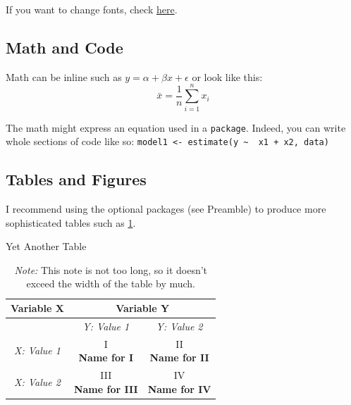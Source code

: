 \documentclass{iheid}
\begin{document}
If you want to change fonts, check \href{https://www.tug.org/pracjourn/2006-1/schmidt/schmidt.pdf}{here}.

\subsection{Math and Code}
Math can be inline such as $ y = \alpha + \beta x + \epsilon $ or look like this: 
$$ \bar{x} = \frac{1}{n} \sum_{i=1}^{n}x_i $$

The math might express an equation used in a \texttt{package}. 
Indeed, you can write whole sections of code like so:
\texttt{model1 <- estimate(y \textasciitilde~ x1 + x2, data)}

\subsection{Tables and Figures}

I recommend using the optional packages (see Preamble) to produce more sophisticated tables such as \cref{tab:alternative}.

\begin{table}[H]
\centering
\caption{Yet Another Table}
\label{tab:alternative}
    \begin{tabular}{c c c}
    	\toprule
    	\textbf{Variable X} & \multicolumn{2}{c}{\textbf{Variable Y}} \\
    	\midrule
        & \textit{Y: Value 1} & \textit{Y: Value 2} \\ \midrule
        \textit{X: Value 1} & \makecell{I\\ \textbf{Name for I}} & \makecell{II\\ \textbf{Name for II}} \\ \midrule
        \textit{X: Value 2} & \makecell{III\\ \textbf{Name for III}} & \makecell{IV\\ \textbf{Name for IV}}  \\ 
    	\bottomrule
    \end{tabular}
    \caption*{\footnotesize\textit{Note:} This note is not too long, so it doesn't exceed the width of the table by much.}
\end{table}
\end{document}
